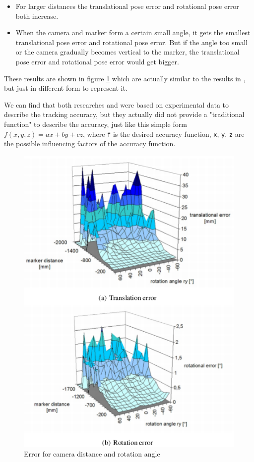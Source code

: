 \begin{itemize}
\item For larger distances the translational pose error and rotational pose error both increase. 
\item When the camera and marker form a certain small angle, it gets the smallest translational pose error and rotational pose error. But if the angle too small or the camera gradually becomes vertical to the marker, the translational pose error and rotational pose error would get bigger.
\end{itemize}

These results are shown in figure \ref{fig:Error_distance_angle} which are actually similar to the results in \cite{abawi2004accuracy}, but just in different form to represent it.

We can find that both researches \cite{abawi2004accuracy} and \cite{pentenrieder2006analysis}
were based on experimental data to describe the tracking accuracy, but they actually did not provide a "traditional function" to describe the accuracy, just like this simple form $f(x,y,z) = ax+by+cz$, where \texttt{f} is the desired accuracy function, \texttt{x}, \texttt{y}, \texttt{z} are the possible influencing factors of the accuracy function. 

\begin{figure}[H]
\centering
\includegraphics[scale=0.7]{./fig/Error_distance_angle.png}
\caption{Error for camera distance and rotation angle\cite{pentenrieder2006analysis}}
\label{fig:Error_distance_angle}
\end{figure}

